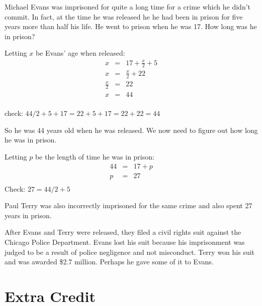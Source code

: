 \documentclass[fleqn,addpoints]{exam}
\begin{document}
\begin{questions}
\begin{parts}
\begin{part}
\begin{solution}
\end{solution}

\end{part}

\begin{part}

Michael Evans was imprisoned for quite a long time for a crime which he didn't commit.  In fact, at the
time he was released he he had been in prison for five years more than half his life. He went to prison when he was
17.  How long was he in prison? 

\begin{solution}
  Letting $x$ be Evans' age when released:
  \begin{eqnarray*}
    x & = & 17 + \frac{x}{2} + 5 \\
    x & = & \frac{x}{2} + 22 \\
    \frac{x}{2} & = & 22 \\
    x & = & 44 \\
  \end{eqnarray*}

check: \( 44/2 + 5 + 17 = 22 + 5 + 17 = 22 + 22 = 44 \)

  So he was 44 years old when he was released.  We now need to figure out how long he was in prison. 

  Letting $p$ be the length of time he was in prison:
  \begin{eqnarray*}
    44 & = & 17 + p \\
    p & = & 27 \\
  \end{eqnarray*}
Check: \( 27 = 44 / 2 + 5  \)

\vspace{.1 in}

Paul Terry was also incorrectly imprisoned for the same crime and also spent 27 years in prison.  

After Evans and Terry were
released, they filed a civil rights suit against the Chicago Police Department.  Evans lost his suit because his
imprisonment was judged to be a result of police negligence and not misconduct.  Terry won his suit and was awarded
\$2.7 million.  Perhaps he gave some of it to Evans.

\end{solution}

\end{part}

\end{parts}

\section{Extra Credit}


\end{questions}
\end{document}
